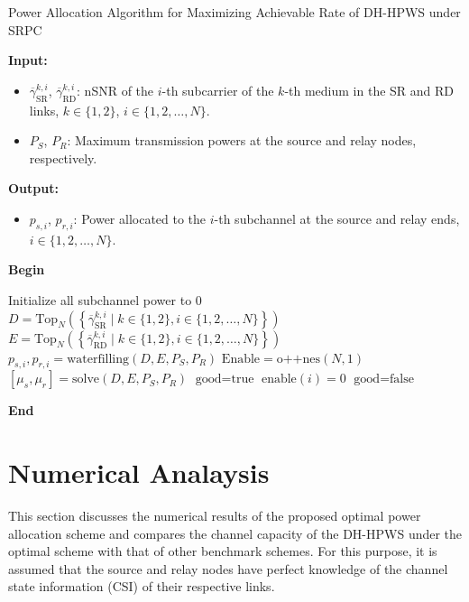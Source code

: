 \documentclass[lettersize,journal]{IEEEtran}
\begin{document}
	\begin{algorithm}
		\caption{Power Allocation Algorithm for Maximizing Achievable Rate of DH-HPWS under SRPC}
		\textbf{Input:}
		\begin{itemize}
			\item \( \overline{\gamma}_{\text{SR}}^{k,i} \), \( \overline{\gamma}_{\text{RD}}^{k,i} \): nSNR of the \( i \)-th subcarrier of the \(k\)-th medium in the SR and RD links, \( k \in \{1, 2\} \), \( i \in \{1, 2, \dots, N\} \).
			\item \( P_S \), \( P_R \): Maximum transmission powers at the source and relay nodes, respectively.
		\end{itemize}
		\textbf{Output:}
		\begin{itemize}
			\item \( p_{s,i} \), \( p_{r,i} \): Power allocated to the \( i \)-th subchannel at the source and relay ends, \( i \in \{1, 2, \dots, N\} \).
		\end{itemize}
		\textbf{Begin}
		\begin{algorithmic}[1]
			\STATE Initialize all subchannel power to 0
			\STATE \( D = \text{Top}_N\left( \left\{ \overline{\gamma}_{\text{SR}}^{k,i} \mid k \in \{1, 2\}, i \in \{1, 2, \dots, N\} \right\} \right) \)
			\STATE \( E = \text{Top}_N\left( \left\{ \overline{\gamma}_{\text{RD}}^{k,i} \mid k \in \{1, 2\}, i \in \{1, 2, \dots, N\} \right\} \right) \)
			\STATE \( p_{s,i}, p_{r,i} = \text{waterfilling}(D, E, P_S, P_R) \)
			\STATE {}
			\ENDIF
			\STATE \( \text{Enable} = \text{o++nes}(N, 1) \)
			\STATE \( [\mu_s, \mu_r] = \text{solve}(D, E, P_S, P_R) \)
			\STATE \( \text{good} = \text{true} \)
			\STATE \( \text{enable}(i) = 0 \)
			\STATE \( \text{good} = \text{false} \)
			\ENDIF
			\ENDFOR
			\STATE {}
			\ENDIF
			\ENDWHILE
		\end{algorithmic}
		\textbf{End}
	\end{algorithm}
	
	\section{Numerical Analaysis}
	\label{na}
	This section discusses the numerical results of the proposed optimal power allocation scheme and compares the channel capacity of the DH-HPWS under the optimal scheme with that of other benchmark schemes. For this purpose, it is assumed that the source and relay nodes have perfect knowledge of the channel state information (CSI) of their respective links.
	
\end{document}
